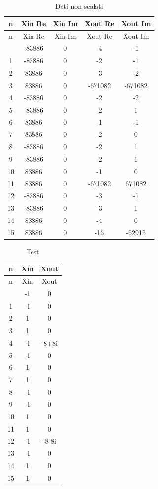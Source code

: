 \documentclass[a4paper, titlepage]{article}
\begin{document}
\begin{longtable}{*5c}
\caption{Dati non scalati}
\label{}\\
\toprule
n & Xin Re & Xin Im & Xout Re & Xout Im \\
\midrule
\endfirsthead
n & Xin Re & Xin Im & Xout Re & Xout Im \\
\midrule
\endhead
\midrule
\endfoot
\bottomrule
\endlastfoot
0 & -83886 & 0 & -4 & -1\\
1 & -83886    & 0 & -2 & -1 \\
2 & 83886    & 0 & -3 & -2 \\
3 & 83886    & 0 & -671082 & -671082 \\
4 & -83886    & 0 & -2 & -2 \\
5 & -83886    & 0 & -2 & 1 \\
6 & 83886    & 0 & -1 & -1 \\
7 & 83886    & 0 & -2 & 0 \\
8 & -83886    & 0 & -2 & 1 \\
9 & -83886    & 0 & -2 & 1 \\
10& 83886    & 0 & -1 & 0 \\
11& 83886    & 0 & -671082 & 671082 \\
12& -83886    & 0 & -3 & -1 \\
13& -83886    & 0 & -3 & 1 \\
14& 83886    & 0 & -4 & 0 \\
15 & 83886 & 0 & -16 & -62915 \\ 
\end{longtable}
\begin{longtable}{*3c}
\caption{Test}
\label{}\\
\toprule
n & Xin & Xout\\
\midrule
\endfirsthead
n & Xin & Xout\\
\midrule
\endhead
\midrule
\endfoot
\bottomrule
\endlastfoot
0 & -1& 0\\
1 & -1& 0\\
2 & 1& 0\\
3 & 1& 0\\
4 & -1& -8+8i\\
5 & -1& 0\\
6 & 1& 0\\
7 & 1& 0 \\
8 & -1& 0 \\
9 & -1& 0\\
10& 1& 0\\
11& 1& 0\\
12& -1& -8-8i\\
13& -1& 0\\
14& 1& 0\\
15& 1& 0\\ 
\end{longtable}
\newpage
\end{document}
